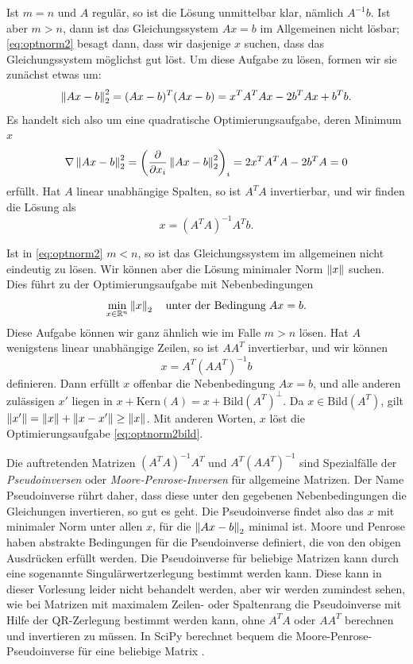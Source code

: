 Ist $m = n$ und $A$ regulär, so ist die Lösung unmittelbar klar,
nämlich $A^{-1}b$. Ist aber $m>n$, dann ist das Gleichungssystem
$Ax=b$ im Allgemeinen nicht lösbar; \eqref{eq:optnorm2} besagt dann,
dass wir dasjenige $x$ suchen, dass das Gleichungssystem möglichst gut
löst. Um diese Aufgabe zu lösen, formen wir sie zunächst etwas um:
\begin{equation}
  \left\lVert{Ax - b}\right\rVert^2_2 = (Ax - b)^T(Ax - b)
  = x^TA^TAx - 2b^TAx + b^Tb.
\end{equation}
Es handelt sich also um eine quadratische Optimierungsaufgabe, deren
Minimum $x$
\begin{equation}
  \nabla \left\lVert{Ax - b}\right\rVert^2_2 = \left(\frac{\partial}{\partial x_i} \left\lVert{Ax -
    b}\right\rVert^2_2\right)_i = 2x^TA^TA - 2b^TA = 0
\end{equation}
erfüllt. Hat $A$ linear unabhängige Spalten, so ist $A^TA$ invertierbar,
und wir finden die Lösung als
\begin{equation}
  x = (A^TA)^{-1}A^Tb.
\end{equation}

Ist in \eqref{eq:optnorm2} $m < n$, so ist das Gleichungssystem im
allgemeinen nicht eindeutig zu lösen. Wir können aber die Lösung
minimaler Norm $\left\lVert{x}\right\rVert$ suchen. Dies führt zu der
Optimierungsaufgabe mit Nebenbedingungen
\begin{equation}
  \label{eq:optnorm2bild}
  \min_{x\in\mathbb{R}^n} \left\lVert{x}\right\rVert_2\quad\text{unter der Bedingung}\; Ax=b.
\end{equation}
Diese Aufgabe können wir ganz ähnlich wie im Falle $m>n$ lösen. Hat
$A$ wenigstens linear unabhängige Zeilen, so ist $AA^T$ invertierbar,
und wir können
\begin{equation}
  x = A^T(AA^T)^{-1}b
\end{equation}
definieren. Dann erfüllt $x$ offenbar die Nebenbedingung $Ax=b$, und
alle anderen zulässigen $x'$ liegen in $x + \text{Kern}(A) = x +
\text{Bild}(A^T)^\perp$. Da $x\in\text{Bild}(A^T)$, gilt
$\left\lVert{x'}\right\rVert=\left\lVert{x}\right\rVert + \left\lVert{x-x'}\right\rVert\ge \left\lVert{x}\right\rVert$. Mit anderen Worten,
$x$ löst die Optimierungsaufgabe \eqref{eq:optnorm2bild}.

Die auftretenden Matrizen $(A^TA)^{-1}A^T$ und $A^T(AA^T)^{-1}$ sind
Spezialfälle der \emph{Pseudoinversen} oder
\emph{Moore-Penrose-Inversen} für allgemeine Matrizen. Der Name
Pseudoinverse rührt daher, dass diese unter den gegebenen
Nebenbedingungen die Gleichungen invertieren, so gut es geht. Die
Pseudoinverse findet also das $x$ mit minimaler Norm unter allen $x$,
für die $\left\lVert{Ax-b}\right\rVert_2$ minimal ist.  Moore und Penrose haben
abstrakte Bedingungen für die Pseudoinverse definiert, die von den
obigen Ausdrücken erfüllt werden. Die Pseudoinverse für beliebige
Matrizen kann durch eine sogenannte Singulärwertzerlegung bestimmt
werden kann. Diese kann in dieser Vorlesung leider nicht behandelt
werden, aber wir werden zumindest sehen, wie bei Matrizen mit
maximalem Zeilen- oder Spaltenrang die Pseudoinverse mit Hilfe
der QR-Zerlegung bestimmt werden kann, ohne $A^TA$ oder $AA^T$
berechnen und invertieren zu müssen. In SciPy berechnet
 bequem die Moore-Penrose-Pseudoinverse
für eine beliebige Matrix .

